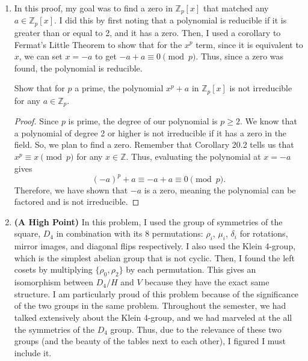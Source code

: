 \documentclass[12pt, oneside]{book}
\newcommand{\pf}[1]{
    \begin{customframedproof}[linecolor=horange!75]
        \begin{proof}
        #1
        \end{proof}
    \end{customframedproof}
}
\newcommand{\Z}{\mathbb{Z}}
\begin{document}
\begin{enumerate}[label=\textbf{\arabic*.}]
    Let \(R\) and \(R'\) be rings, let \(\varphi : R \to R'\) be a homomorphism, and let \(a,b \in R\). Prove that if \(R'\) is an integral domain and \(a,b \notin \ker(\varphi)\), then \(ab \notin \ker(\varphi)\). 
    \pf{
        Let \(\varphi\) be a homomorphism that exists between rings \(R\) and \(R'\), defined as \(\varphi : R \to R'\), and let \(a,b \in R\). Recall that \(\ker(\varphi) = \{r \in R \mid \varphi(r) = 0'\}\), where \(0'\) is the additive identity of \(R'\). Now, suppose that \(a \notin \ker(\varphi)\), \(b \notin \ker(\varphi)\), and \(R'\) is an integral domain. To show that \(ab \notin \ker(\varphi)\), suppose to the contrary that \(ab \in \ker(\varphi)\) instead. This means \(\varphi(ab) = 0'\). Since \(\varphi\) is a homomorphism, we can expand the left side to get \(\varphi(ab) = \varphi(a)\varphi(b) = 0'\). However, this cannot be true, as \(\varphi(a)\) and \(\varphi(b)\) cannot equal \(0'\), and their product cannot equal \(0'\) since \(R'\) is an integral domain and has no zero divisors. Thus, it must be that \(ab \notin \ker(\varphi)\).   
    }
    \item In this proof, my goal was to find a zero in \(\Z_{p}[x]\) that matched any \(a \in \Z_{p}[x]\). I did this by first noting that a polynomial is reducible if it is greater than or equal to 2, and it has a zero. Then, I used a corollary to Fermat's Little Theorem to show that for the \(x^{p}\) term, since it is equivalent to \(x\), we can set \(x = -a\) to get \(-a + a \equiv 0 \pmod{p}\). Thus, since a zero was found, the polynomial is reducible. 
    
    Show that for \(p\) a prime, the polynomial \(x^{p} + a\) in \(\Z_{p} [x]\) is not irreducible for any \(a \in \Z_{p}\).
    \pf{
    Since \(p\) is prime, the degree of our polynomial is \(p \ge 2\). We know that a polynomial of degree 2 or higher is not irreducible if it has a zero in the field. So, we plan to find a zero. Remember that Corollary 20.2 tells us that \(x^{p} \equiv x \pmod{p}\) for any \(x \in \Z\). Thus, evaluating the polynomial at \(x = -a\) gives
    \[
        (-a)^{p} + a \equiv -a + a \equiv 0 \pmod{p}.
    \]
    Therefore, we have shown that \(-a\) is a zero, meaning the polynomial can be factored and is not irreducible.
    }
\newpage
    \item \textbf{(A High Point)} In this problem, I used the group of symmetries of the square, \(D_{4}\) in combination with its 8 permutations: \(\rho_{i}\), \(\mu_{i}\), \(\delta_{i}\) for rotations, mirror images, and diagonal flips respectively. I also used the Klein 4-group, which is the simplest abelian group that is not cyclic. Then, I found the left cosets by multiplying \(\{\rho_{0}, \rho_{2}\}\) by each permutation. This gives an isomorphism between \(D_{4}/H\) and \(V\) because they have the exact same structure. I am particularly proud of this problem because of the significance of the two groups in the same problem. Throughout the semester, we had talked extensively about the Klein 4-group, and we had marveled at the all the symmetries of the \(D_{4}\) group. Thus, due to the relevance of these two groups (and the beauty of the tables next to each other), I figured I must include it.
    

\end{enumerate}
\end{document}
